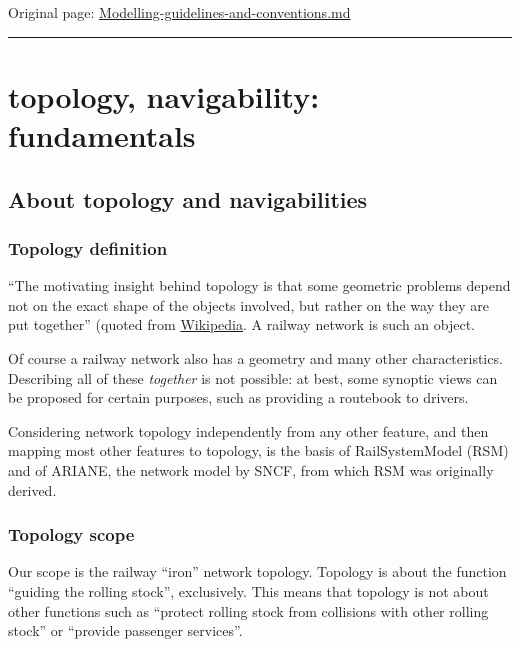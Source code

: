 \documentclass[
  11pt,
]{article}
\begin{document}
Original page:
\href{https://github.com/UICrail/CDM-RSM/wiki/Modelling-guidelines-and-conventions}{Modelling-guidelines-and-conventions.md}

\begin{center}\rule{0.5\linewidth}{0.5pt}\end{center}

\hypertarget{topology-navigability-fundamentals}{%
\section{topology, navigability:
fundamentals}\label{topology-navigability-fundamentals}}

\hypertarget{about-topology-and-navigabilities}{%
\subsection{About topology and
navigabilities}\label{about-topology-and-navigabilities}}

\hypertarget{topology-definition}{%
\subsubsection{Topology definition}\label{topology-definition}}

``The motivating insight behind topology is that some geometric problems
depend not on the exact shape of the objects involved, but rather on the
way they are put together'' (quoted from
\href{https://en.wikipedia.org/wiki/Topology}{Wikipedia}. A railway
network is such an object.

Of course a railway network also has a geometry and many other
characteristics. Describing all of these \emph{together} is not
possible: at best, some synoptic views can be proposed for certain
purposes, such as providing a routebook to drivers.

Considering network topology independently from any other feature, and
then mapping most other features to topology, is the basis of
RailSystemModel (RSM) and of ARIANE, the network model by SNCF, from
which RSM was originally derived.

\hypertarget{topology-scope}{%
\subsubsection{Topology scope}\label{topology-scope}}

Our scope is the railway ``iron'' network topology. Topology is about
the function ``guiding the rolling stock'', exclusively. This means that
topology is not about other functions such as ``protect rolling stock
from collisions with other rolling stock'' or ``provide passenger
services''.
\end{document}

